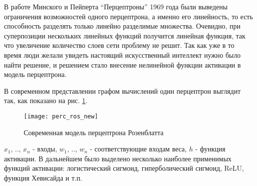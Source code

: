 \par
В работе Минского и Пейперта “Перцептроны”\cite{minsky} 1969 года были выведены
ограничения возможностей одного перцептрона, а именно его линейность, то есть
способность разделять только линейно разделимые множества. Очевидно, при
суперпозиции нескольких линейных функций получится линейная функция, так что
увеличение количество слоев сети проблему не решит. Так как уже в то время люди
желали увидеть настоящий искусственный интеллект нужно было найти решение, и
решением стало внесение нелинейной функции активации в модель перцептрона.
\par
В современном представлении графом вычислений один перцептрон выглядит так,
как показано на рис. \ref{hist:rosnew}.
\begin{figure}[H]
	\centering
	\texttt{[image: perc\_ros\_new]}
	\caption{Современная модель перцептрона Розенблатта}
	\label{hist:rosnew}
\end{figure}
$x_1$, .., $x_n$ - входы, $w_1$, .., $w_n$ - соответствующие входам веса, $h$ - 
функция активации. В дальнейшем было выделено несколько наиболее применимых
функций активации: логистический сигмоид, гиперболический сигмоид, ReLU, функция
Хевисайда и т.п.
